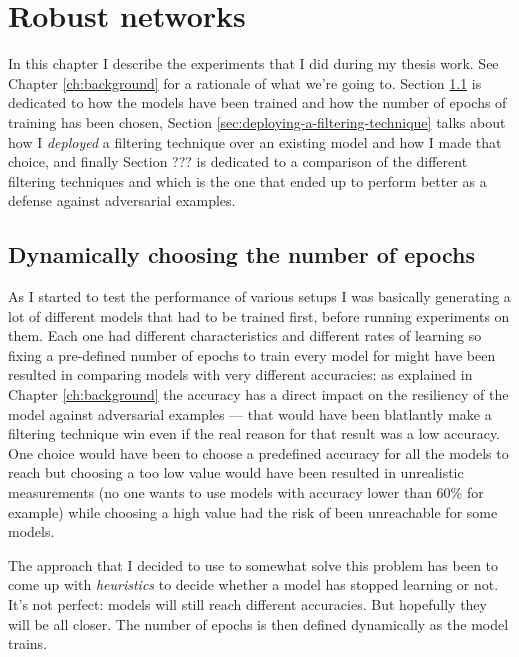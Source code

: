 \chapter{Robust networks}
\label{ch:robust-networks}

In this chapter I describe the experiments that I did during my thesis
work. See Chapter \ref{ch:background} for a rationale of what we're
going to. Section \ref{sec:dynamically-choosing-the-number-of-epochs}
is dedicated to how the models have been trained and how the number of
epochs of training has been chosen, Section
\ref{sec:deploying-a-filtering-technique} talks about how I
\emph{deployed} a filtering technique over an existing model and how I
made that choice, and finally Section ??? is dedicated to a comparison
of the different filtering techniques and which is the one that ended
up to perform better as a defense against adversarial examples.

\section{Dynamically choosing the number of epochs}
\label{sec:dynamically-choosing-the-number-of-epochs}

As I started to test the performance of various setups I was basically
generating a lot of different models that had to be trained first,
before running experiments on them. Each one had different
characteristics and different rates of learning so fixing a pre-defined
number of epochs to train every model for might have been resulted in
comparing models with very different accuracies: as explained in
Chapter \ref{ch:background} the accuracy has a direct impact on the
resiliency of the model against adversarial examples --- that would
have been blatlantly make a filtering technique win even if the real
reason for that result was a low accuracy. One choice would have been
to choose a predefined accuracy for all the models to reach but
choosing a too low value would have been resulted in unrealistic
measurements (no one wants to use models with accuracy lower than 60\%
for example) while choosing a high value had the risk of been
unreachable for some models.

The approach that I decided to use to somewhat solve this problem has
been to come up with \emph{heuristics} to decide whether a model has
stopped learning or not. It's not perfect: models will still reach
different accuracies. But hopefully they will be all closer. The number
of epochs is then defined dynamically as the model trains.

